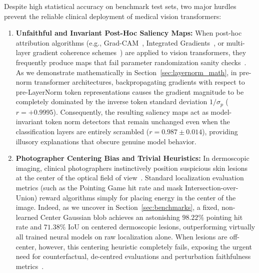 \documentclass[11pt,a4paper]{article}
\begin{document}
Despite high statistical accuracy on benchmark test sets, two major hurdles prevent the reliable clinical deployment of medical vision transformers:
\begin{enumerate}
    \item \textbf{Unfaithful and Invariant Post-Hoc Saliency Maps:} When post-hoc attribution algorithms (e.g., Grad-CAM~\cite{selvaraju2017gradcam}, Integrated Gradients~\cite{sundararajan2017axiomatic}, or multi-layer gradient coherence schemes~\cite{smilkov2017smoothgrad}) are applied to vision transformers, they frequently produce maps that fail parameter randomization sanity checks~\cite{adebayo2018sanity}. As we demonstrate mathematically in Section~\ref{sec:layernorm_math}, in pre-norm transformer architectures, backpropagating gradients with respect to pre-LayerNorm token representations causes the gradient magnitude to be completely dominated by the inverse token standard deviation $1/\sigma_p$ ($r = +0.9995$). Consequently, the resulting saliency maps act as model-invariant token norm detectors that remain unchanged even when the classification layers are entirely scrambled ($r = 0.987 \pm 0.014$), providing illusory explanations that obscure genuine model behavior.
    \item \textbf{Photographer Centering Bias and Trivial Heuristics:} In dermoscopic imaging, clinical photographers instinctively position suspicious skin lesions at the center of the optical field of view~\cite{bissoto2019constructing, bissoto2020debiasing, winkler2019association}. Standard localization evaluation metrics (such as the Pointing Game hit rate and mask Intersection-over-Union) reward algorithms simply for placing energy in the center of the image. Indeed, as we uncover in Section~\ref{sec:benchmarks}, a fixed, non-learned Center Gaussian blob achieves an astonishing $98.22\%$ pointing hit rate and $71.38\%$ IoU on centered dermoscopic lesions, outperforming virtually all trained neural models on raw localization alone. When lesions are off-center, however, this centering heuristic completely fails, exposing the urgent need for counterfactual, de-centred evaluations and perturbation faithfulness metrics~\cite{blucher2024decoupling}.
\end{enumerate}
\end{document}
